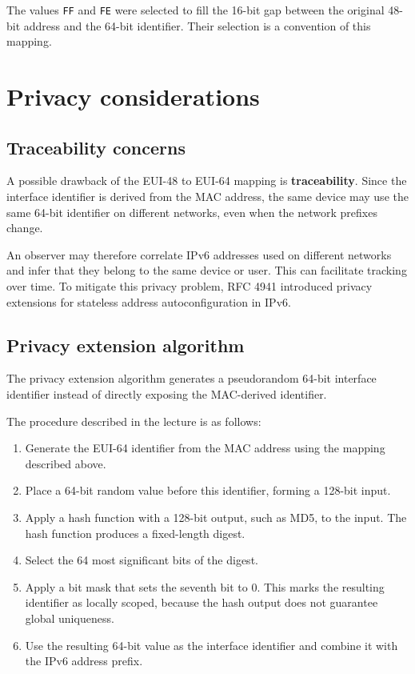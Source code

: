 The values \texttt{FF} and \texttt{FE} were selected to fill the
16-bit gap between the original 48-bit address and the 64-bit
identifier. Their selection is a convention of this mapping.

\section{Privacy considerations}

\subsection{Traceability concerns}

A possible drawback of the EUI-48 to EUI-64 mapping is
\textbf{traceability}. Since the interface identifier is derived
from the MAC address, the same device may use the same 64-bit
identifier on different networks, even when the network prefixes
change.

An observer may therefore correlate IPv6 addresses used on different
networks and infer that they belong to the same device or user.
This can facilitate tracking over time. To mitigate this privacy
problem, RFC 4941 introduced privacy extensions for stateless address
autoconfiguration in IPv6.

\subsection{Privacy extension algorithm}

The privacy extension algorithm generates a pseudorandom
64-bit interface identifier instead of directly exposing the
MAC-derived identifier.

The procedure described in the lecture is as follows:

\begin{enumerate}
	\item Generate the EUI-64 identifier from the MAC address using
	the mapping described above.
	\item Place a 64-bit random value before this identifier, forming
	a 128-bit input.
	\item Apply a hash function with a 128-bit output, such as MD5,
	to the input. The hash function produces a fixed-length digest.
	\item Select the 64 most significant bits of the digest.
	\item Apply a bit mask that sets the seventh bit to 0. This marks
	the resulting identifier as locally scoped, because the hash
	output does not guarantee global uniqueness.
	\item Use the resulting 64-bit value as the interface identifier
	and combine it with the IPv6 address prefix.
\end{enumerate}


